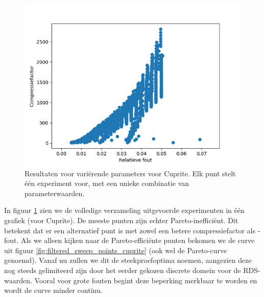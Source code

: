 \begin{figure}[H]
  \centering
  \includegraphics[scale=0.7]{images/all_sweep_points_cuprite.png}
  \caption{Resultaten voor vari\"erende parameters voor Cuprite. Elk punt stelt \'e\'en experiment voor, met een unieke combinatie van parameterwaarden.}
  \label{fig:all_sweep_points_cuprite}
\end{figure}

In figuur \ref{fig:all_sweep_points_cuprite} zien we de volledige verzameling uitgevoerde experimenten in \'e\'en grafiek (voor Cuprite). De meeste punten zijn echter Pareto-ineffici\"ent. Dit betekent dat er een alternatief punt is met zowel een betere compressiefactor als -fout. Als we alleen kijken naar de Pareto-effici\"ente punten bekomen we de curve uit figuur \ref{fig:filtered_sweep_points_cuprite} (ook wel de Pareto-curve genoemd). Vanaf nu zullen we dit de steekproefoptima noemen, aangezien deze nog steeds gelimiteerd zijn door het eerder gekozen discrete domein voor de RDS-waarden. Vooral voor grote fouten begint deze beperking merkbaar te worden en wordt de curve minder continu.

